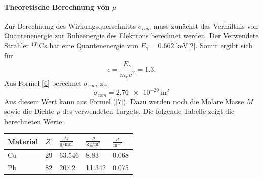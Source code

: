 \documentclass[11pt,ngerman,a4paper]{article}
\begin{document}
\paragraph{Theoretische Berechnung von $\mu$}
Zur Berechnung des Wirkungsquerschnitts $\sigma_{com}$ muss zunächst das Verhältnis von Quantenenergie zur Ruheenergie des Elektrons berechnet werden. Der Verwendete Strahler ${}^{137}$Cs  hat eine Quantenenergie von $E_\gamma = \SI{0.662}{\kilo\eV}$[2]. Somit ergibt sich für 
\[
\epsilon =  \frac{E_\gamma}{m_ec^2} = \num{1.3}.
\]
Aus Formel \ref{6} berechnet $\sigma_{com}$ zu
\[
\sigma_{com} = \SI{2.76e-29}{\meter\squared}
\]
Aus diesem Wert kann aus Formel (\ref{7}). Dazu werden noch die Molare Masse $M$ sowie die Dichte $\rho$ des verwendeten Targets. Die folgende Tabelle zeigt die berechneten Werte:
\begin{table}[h]
\centering
\begin{tabular}{lllll}
\toprule
	Material & $Z$ & $\frac{M}{\si{\gram\per\mole}}$ &$\frac{\rho}{\si{\kilo\gram\per\meter\squared}}$ &$\frac{\mu}{\si{\meter^{-1}}}$ \\
\midrule
	Cu & 29 &63.546  &8.83 & 0.068\\
	Pb &82 & 207.2& 11.342 & 0.075    \\
\bottomrule
\end{tabular}
\label{tab_gamma2}
\end{table} 
\end{document}
